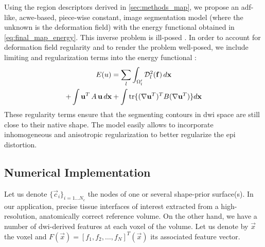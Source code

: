 {\color{red} {Using the region descriptors derived in \autoref{sec:methods_map}, we propose
an \gls{adf}-like, \gls{acwe}-based, piece-wise constant, image segmentation
model (where the unknown is the deformation field)
\cite{chan_active_2001} with the energy functional obtained in 
\eqref{eq:final_map_energy}. This inverse problem is ill-posed
\cite{bertero_ill-posed_1988,hadamard_sur_1902}.
In order to account for deformation field regularity and to render the 
problem well-posed, we include limiting and regularization terms into 
the energy functional \cite{morozov_linear_1975,tichonov_solution_1963}:
%
\begin{multline}
E(u) = \sum\limits_l \int_{\Omega'_l} \mdist{f}{l} \,d\vec{x} \\
+ \int \vec{u}^T \, A \, \vec{u} \, d\vec{x} + \int \tr\{(\nabla \vec{u}^T)^T B (\nabla \vec{u}^T)\} d\vec{x}
\label{eq:complete_energy}
\end{multline}
%
These regularity terms ensure that the segmenting contours in 
\gls{dwi} space are still close to their native shape. The model
easily allows to incorporate inhomogeneous and anisotropic 
regularization \cite{nagel_investigation_1986} to better regularize
the \gls{epi} distortion.}}


\subsection{Numerical Implementation}
\label{sec:numerical_implementation}
%
Let us denote $\{\vec{c}_i\}_{i=1 \ldots N_c}$ the nodes of one or several shape-prior
surface(s). In our application, precise tissue interfaces of interest 
extracted from a high-resolution, anatomically correct reference volume. 
On the other hand, we have a number of \gls{dwi}-derived features at each
voxel of the volume. Let us denote by $\vec{x}$ the voxel and $F(\vec{x}) = 
[ f_1, f_2, \ldots, f_N]^T(\vec{x})$ its associated feature vector.

